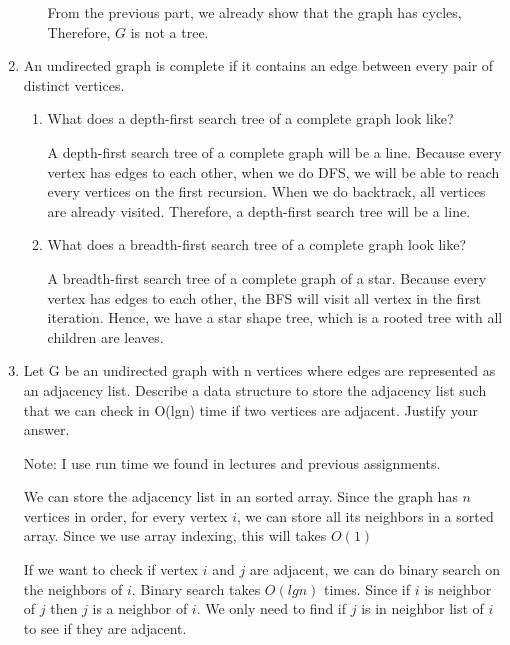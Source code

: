 \documentclass{cpsc413Solutions}
\begin{document}
\begin{problemlist}
\begin{problem}
\begin{answer}
\begin{enumerate}
\begin{enumerate}
        From the previous part, we already show that the graph has cycles, Therefore, $G$ is not a tree.
        \end{enumerate}
        
    \item  An undirected graph is complete if it contains an edge between every pair of distinct vertices. 
    
    \begin{enumerate}
        \item What does a depth-ﬁrst search tree of a complete graph look like?
        
        A depth-first search tree of a complete graph will be a line. Because every vertex has edges to each other, when we do DFS, we will be able to reach every vertices on the first recursion. When we do backtrack, all vertices are already visited. Therefore, a depth-first search tree will be a line.
        
        \item What does a breadth-ﬁrst search tree of a complete graph look like?
        
        A breadth-first search tree of a complete graph of a star. Because every vertex has edges to each other, the BFS will visit all vertex in the first iteration. Hence, we have a star shape tree, which is a rooted tree with all children are leaves.
        
    \end{enumerate}
    
    \item  Let G be an undirected graph with n vertices where edges are represented as an adjacency list. Describe a data structure to store the adjacency list such that we can check in O(lgn) time if two vertices are adjacent. Justify your answer. 
    
    Note: I use run time we found in lectures and previous assignments.
    
    We can store the adjacency list in an sorted array. Since the graph has $n$ vertices in order, for every vertex $i$, we can store all its neighbors in a sorted array. Since we use array indexing, this will takes ${O}(1)$
    
    If we want to check if vertex $i$ and $j$ are adjacent, we can do binary search on the neighbors of $i$. Binary search takes ${O}(lgn)$ times. Since if $i$ is neighbor of $j$ then $j$ is a neighbor of $i$. We only need to find if $j$ is in neighbor list of $i$ to see if they are adjacent.
    

\end{enumerate}
\end{answer}
\end{problem}
\end{problemlist}
\end{document}
